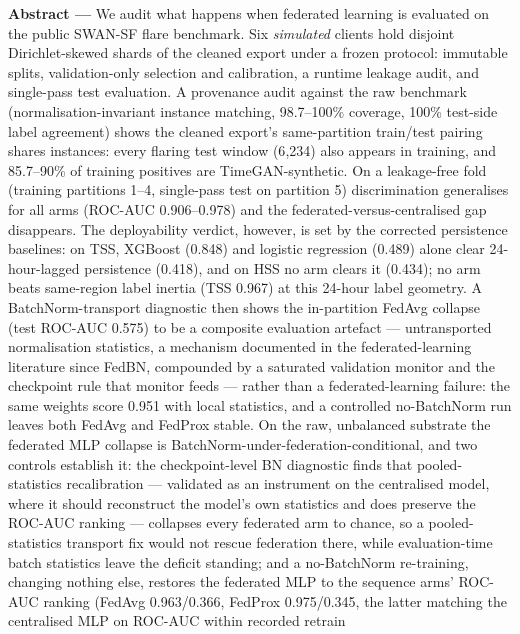 \documentclass[11pt,a4paper]{article}
\begin{document}
\begin{center}
\begin{minipage}{0.92\textwidth}
\footnotesize
\textbf{Abstract ---}
We audit what happens when federated learning is evaluated on the
public SWAN-SF flare benchmark. Six \emph{simulated} clients hold
disjoint Dirichlet-skewed shards of the cleaned export under a frozen
protocol: immutable splits, validation-only selection and calibration,
a runtime leakage audit, and single-pass test evaluation. A provenance
audit against the raw benchmark (normalisation-invariant instance
matching, 98.7--100\% coverage, 100\% test-side label agreement) shows
the cleaned export's same-partition train/test pairing shares
instances: every flaring test window (6{,}234) also appears in
training, and 85.7--90\% of training positives are TimeGAN-synthetic.
On a leakage-free fold (training partitions 1--4, single-pass test on
partition 5) discrimination generalises for all arms (ROC-AUC
0.906--0.978) and the federated-versus-centralised gap disappears.
The deployability verdict, however, is set by the corrected
persistence baselines: on TSS, XGBoost (0.848) and logistic
regression (0.489) alone clear 24-hour-lagged persistence (0.418),
and on HSS no arm clears it (0.434); no arm beats same-region label
inertia (TSS 0.967) at this 24-hour label geometry. A
BatchNorm-transport diagnostic then shows the in-partition FedAvg
collapse (test ROC-AUC 0.575) to be a composite evaluation artefact
--- untransported normalisation statistics, a mechanism documented in
the federated-learning literature since FedBN, compounded by a
saturated validation monitor and the checkpoint rule that monitor
feeds --- rather than a federated-learning failure: the same weights
score 0.951 with local statistics, and a controlled no-BatchNorm run
leaves both FedAvg and FedProx stable. On the raw, unbalanced substrate
the federated MLP collapse is BatchNorm-under-federation-conditional,
and two controls establish it: the checkpoint-level BN diagnostic
finds that pooled-statistics recalibration --- validated as an
instrument on the centralised model, where it should reconstruct the model's
own statistics and does preserve the ROC-AUC ranking --- collapses every
federated arm to chance, so a pooled-statistics transport fix would
not rescue federation there, while evaluation-time batch statistics
leave the deficit standing; and a no-BatchNorm re-training, changing
nothing else, restores the federated MLP to the sequence arms'
ROC-AUC ranking (FedAvg 0.963/0.366, FedProx 0.975/0.345, the latter
matching the centralised MLP on ROC-AUC within recorded retrain

\end{minipage}
\end{center}
\end{document}
